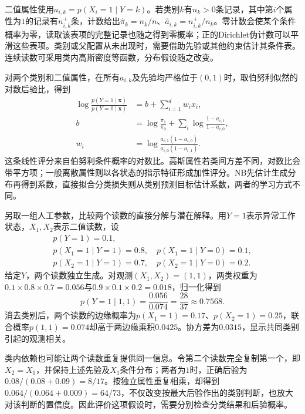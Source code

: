 二值属性使用$a_{i,k}=p(X_i=1\mid Y=k)$。若类别$k$有$n_k>0$条记录，其中第$i$个属性为$1$的记录有$n_{i,k}^{+}$条，计数给出$\widehat\pi_k=n_k/n$、$\widehat a_{i,k}=n_{i,k}^{+}/n_k$。零计数会使某个条件概率为零，读取该表项的完整记录也随之得到零概率；正的Dirichlet伪计数可以平滑这些表项。类别或父配置从未出现时，需要借助先验或其他约束估计其条件表。连续读数可采用类内高斯密度等函数，分布假设随之改变。

对两个类别和二值属性，在所有$a_{i,k}$及先验均严格位于$(0,1)$时，取伯努利似然的对数后验比，得到
\begin{equation}
  \label{eq:pgm-static-directed-naive-boundary}
  \begin{aligned}
  \log\frac{p(Y=1\mid\bm{x})}{p(Y=0\mid\bm{x})}
    &=b+\sum_{i=1}^{d}w_i x_i,\\
  b&=\log\frac{\pi_1}{\pi_0}
       +\sum_i\log\frac{1-a_{i,1}}{1-a_{i,0}},\\
  w_i&=\log\frac{a_{i,1}(1-a_{i,0})}
                       {a_{i,0}(1-a_{i,1})}.
  \end{aligned}
\end{equation}
这条线性评分来自伯努利条件概率的对数比。高斯属性若类间方差不同，对数比会带平方项；一般离散属性则以各状态的指示特征形成加性评分。NB先估计生成分布再得到系数，直接拟合分类损失则从类别预测目标估计系数，两者的学习方式不同。

\begin{example}[两个二值读数]
  \label{ex:pgm-static-directed-binary}
  另取一组人工参数，比较两个读数的直接分解与潜在解释。用$Y=1$表示异常工作状态，$X_1,X_2$表示二值读数，设
  \[
  \begin{gathered}
    p(Y=1)=0.1,\\
    p(X_1=1\mid Y=1)=0.8,\quad
    p(X_1=1\mid Y=0)=0.1,\\
    p(X_2=1\mid Y=1)=0.7,\quad
    p(X_2=1\mid Y=0)=0.2.
  \end{gathered}
  \]
  给定$Y$，两个读数独立生成。对观测$(X_1,X_2)=(1,1)$，两类权重为$0.1\times0.8\times0.7=0.056$与$0.9\times0.1\times0.2=0.018$，归一化得到
  \[
    p(Y=1\mid1,1)=\frac{0.056}{0.074}
      =\frac{28}{37}\approx0.7568.
  \]
  消去类别后，两个读数的边缘概率为$p(X_1=1)=0.17$、$p(X_2=1)=0.25$，联合概率$p(1,1)=0.074$却高于两边缘乘积$0.0425$。协方差为$0.0315$，显示共同类别引起的观测相关。
\end{example}

类内依赖也可能让两个读数重复提供同一信息。令第二个读数完全复制第一个，即$X_2=X_1$，并保持上述先验及$X_1$条件分布；两者为$1$时，正确后验为$0.08/(0.08+0.09)=8/17$。按独立属性重复相乘，却得到$0.064/(0.064+0.009)=64/73$，不仅改变按最大后验作出的类别判断，也放大对该判断的置信度。因此评价这项假设时，需要分别检查分类结果和后验概率。

